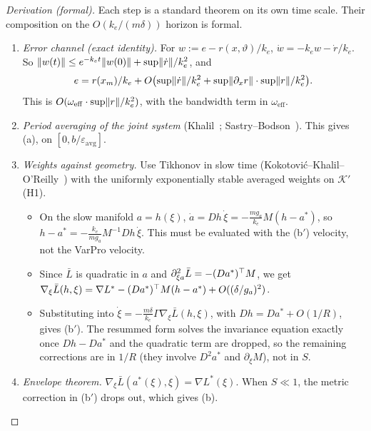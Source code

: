 \begin{proof}[Derivation (formal)]
Each step is a standard theorem on its own time scale. Their composition on the $O(k_e/(m\delta))$ horizon is formal.
\begin{enumerate}[label=\arabic*.,leftmargin=2em]
  \item \emph{Error channel (exact identity).} For $w := e - r(x,\vartheta)/k_e$, $\dot w = -k_e w - \dot r/k_e$. So
    $\lVert w(t)\rVert \le e^{-k_et}\lVert w(0)\rVert + \sup\lVert \dot r\rVert/k_e^2$, and
    \begin{equation*}
      e = r(x_m)/k_e + O\bigl(\sup\lVert \dot r\rVert/k_e^2 + \sup\lVert \partial_x r\rVert\cdot\sup\lVert r\rVert/k_e^2\bigr).
    \end{equation*}
    This is $O(\omega_{\mathrm{eff}}\cdot\sup\lVert r\rVert/k_e^2)$, with the bandwidth term in $\omega_{\mathrm{eff}}$.
  \item \emph{Period averaging of the joint system} (Khalil~\cite[Thm.~10.4]{khalil2002};
    Sastry--Bodson~\cite[Ch.~4]{sb1989}). This gives (a), on $[0, b/\varepsilon_{\mathrm{avg}}]$.
  \item \emph{Weights against geometry.} Use Tikhonov in slow time (Kokotović--Khalil--O'Reilly~\cite{kko1986}) with
    the uniformly exponentially stable averaged weights on $\mathcal{K}'$ (H1).
    \begin{itemize}
      \item On the slow manifold $a = h(\xi)$,
        $\dot a = Dh\,\dot\xi = -\frac{mg_a}{k_e}M(h - a^*)$, so
        $h - a^* = -\frac{k_e}{mg_a}M^{-1}Dh\,\dot\xi$. This must be evaluated with the (b$'$) velocity, not the
        VarPro velocity.
      \item Since $\bar L$ is quadratic in $a$ and $\partial^2_{\xi a}\bar L = -(Da^*)^\top M$, we get
        $\nabla_\xi\bar L(h,\xi) = \nabla L^* - (Da^*)^\top M(h - a^*) + O((\delta/g_a)^2)$.
      \item Substituting into $\dot\xi = -\frac{m\delta}{k_e}\Gamma\nabla_\xi\bar L(h,\xi)$, with
        $Dh = Da^* + O(1/R)$, gives (b$'$). The resummed form solves the invariance equation exactly once
        $Dh - Da^*$ and the quadratic term are dropped, so the remaining corrections are in $1/R$ (they involve
        $D^2a^*$ and $\partial_\xi M$), not in $S$.
    \end{itemize}
  \item \emph{Envelope theorem.} $\nabla_\xi\bar L(a^*(\xi),\xi) = \nabla L^*(\xi)$. When $S\ll1$, the metric
    correction in (b$'$) drops out, which gives (b).
\end{enumerate}

\end{proof}
